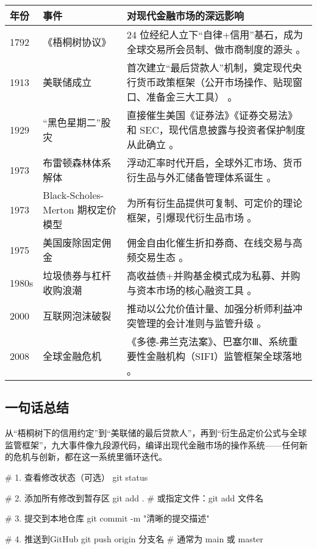 \begin{table}[H]
\centering
\renewcommand{\arraystretch}{1.2}
\begin{tabular}{p{1.5cm}p{3.5cm}p{9.5cm}}
\toprule
\textbf{年份} & \textbf{事件} & \textbf{对现代金融市场的深远影响} \\ 
\midrule
1792 & 《梧桐树协议》 & 24 位经纪人立下“自律+信用”基石，成为全球交易所会员制、做市商制度的源头 。 \\ 
1913 & 美联储成立 & 首次建立“最后贷款人”机制，奠定现代央行货币政策框架（公开市场操作、贴现窗口、准备金三大工具） 。 \\ 
1929 & “黑色星期二”股灾 & 直接催生美国《证券法》《证券交易法》和 SEC，现代信息披露与投资者保护制度从此确立 。 \\
1973 & 布雷顿森林体系解体 & 浮动汇率时代开启，全球外汇市场、货币衍生品与外汇储备管理体系诞生 。 \\ 
1973 & Black-Scholes-Merton 期权定价模型 & 为所有衍生品提供可复制、可定价的理论框架，引爆现代衍生品市场 。 \\ 
1975 & 美国废除固定佣金 & 佣金自由化催生折扣券商、在线交易与高频交易生态 。 \\ 
1980s & 垃圾债券与杠杆收购浪潮 & 高收益债+并购基金模式成为私募、并购与资本市场的核心融资工具 。 \\ 
2000 & 互联网泡沫破裂 & 推动以公允价值计量、加强分析师利益冲突管理的会计准则与监管升级 。 \\ 
2008 & 全球金融危机 & 《多德-弗兰克法案》、巴塞尔Ⅲ、系统重要性金融机构（SIFI）监管框架全球落地 。 \\ 
\bottomrule
\end{tabular}
\end{table}

\subsection{一句话总结}
从“梧桐树下的信用约定”到“美联储的最后贷款人”，再到“衍生品定价公式与全球监管框架”，九大事件像九段源代码，编译出现代金融市场的操作系统——任何新的危机与创新，都在这一系统里循环迭代。


# 1. 查看修改状态（可选）
git status

# 2. 添加所有修改到暂存区
git add .   # 或指定文件：git add 文件名

# 3. 提交到本地仓库
git commit -m "清晰的提交描述"

# 4. 推送到GitHub
git push origin 分支名   # 通常为 main 或 master